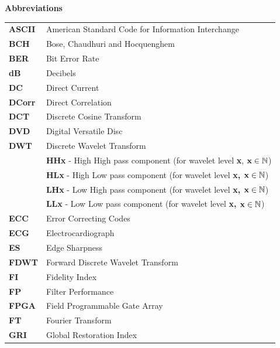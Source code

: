 \documentclass[12pt]{report}
\renewcommand{\baselinestretch}{1.5}
\begin{document}
\newpage
\renewcommand{\baselinestretch}{1}
\setlength{\topskip}{2.6cm}
\noindent \huge {\bf Abbreviations} \normalsize \\
\begin{table}[!ht]
\footnotesize
\begin{tabular}{p{3cm}l} \\
{\bf ASCII}     & American Standard Code for Information Interchange \\
{\bf BCH}       & Bose, Chaudhuri and Hocquenghem \\
{\bf BER}       & Bit Error Rate \\
{\bf dB}        & Decibels \\
{\bf DC}        & Direct Current \\
{\bf DCorr}     & Direct Correlation \\
{\bf DCT}       & Discrete Cosine Transform \\
{\bf DVD}       & Digital Versatile Disc \\
{\bf DWT}       & Discrete Wavelet Transform \\
        & {\bf HHx} - High High pass component (for wavelet level {\bf x}, $\mbox{\bf x} \in \mathbb{N}$)\\
        & {\bf HLx} - High Low pass component (for wavelet level {\bf x, $\mbox{\bf x} \in \mathbb{N}$})\\
        & {\bf LHx} - Low High pass component (for wavelet level {\bf x, $\mbox{\bf x} \in \mathbb{N}$})\\
        & {\bf LLx} - Low Low pass component (for wavelet level {\bf x, $\mbox{\bf x} \in \mathbb{N}$}) \\
{\bf ECC}       & Error Correcting Codes \\
{\bf ECG}               & Electrocardiograph \\
{\bf ES}               & Edge Sharpness \\
{\bf FDWT}              & Forward Discrete Wavelet Transform \\
{\bf FI}              & Fidelity Index\\
{\bf FP}              & Filter Performance \\
{\bf FPGA}      & Field Programmable Gate Array \\
{\bf FT}                & Fourier Transform \\
{\bf GRI}                & Global Restoration Index\\

\end{tabular}
\end{table}
\end{document}
